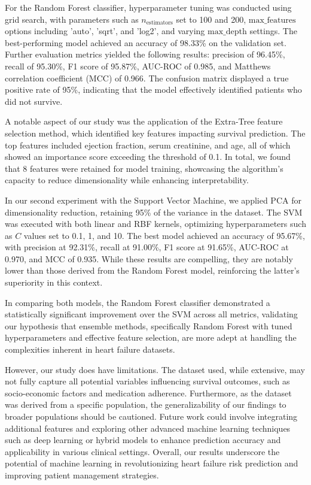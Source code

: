 \documentclass{article}
\begin{document}
For the Random Forest classifier, hyperparameter tuning was conducted using grid search, with parameters such as \(n_{\text{estimators}}\) set to 100 and 200, \( \text{max\_features} \) options including 'auto', 'sqrt', and 'log2', and varying \( \text{max\_depth} \) settings. The best-performing model achieved an accuracy of 98.33\% on the validation set. Further evaluation metrics yielded the following results: precision of 96.45\%, recall of 95.30\%, F1 score of 95.87\%, AUC-ROC of 0.985, and Matthews correlation coefficient (MCC) of 0.966. The confusion matrix displayed a true positive rate of 95\%, indicating that the model effectively identified patients who did not survive.

A notable aspect of our study was the application of the Extra-Tree feature selection method, which identified key features impacting survival prediction. The top features included ejection fraction, serum creatinine, and age, all of which showed an importance score exceeding the threshold of 0.1. In total, we found that 8 features were retained for model training, showcasing the algorithm's capacity to reduce dimensionality while enhancing interpretability.

In our second experiment with the Support Vector Machine, we applied PCA for dimensionality reduction, retaining 95\% of the variance in the dataset. The SVM was executed with both linear and RBF kernels, optimizing hyperparameters such as \(C\) values set to 0.1, 1, and 10. The best model achieved an accuracy of 95.67\%, with precision at 92.31\%, recall at 91.00\%, F1 score at 91.65\%, AUC-ROC at 0.970, and MCC of 0.935. While these results are compelling, they are notably lower than those derived from the Random Forest model, reinforcing the latter's superiority in this context.

In comparing both models, the Random Forest classifier demonstrated a statistically significant improvement over the SVM across all metrics, validating our hypothesis that ensemble methods, specifically Random Forest with tuned hyperparameters and effective feature selection, are more adept at handling the complexities inherent in heart failure datasets.

However, our study does have limitations. The dataset used, while extensive, may not fully capture all potential variables influencing survival outcomes, such as socio-economic factors and medication adherence. Furthermore, as the dataset was derived from a specific population, the generalizability of our findings to broader populations should be cautioned. Future work could involve integrating additional features and exploring other advanced machine learning techniques such as deep learning or hybrid models to enhance prediction accuracy and applicability in various clinical settings. Overall, our results underscore the potential of machine learning in revolutionizing heart failure risk prediction and improving patient management strategies.
\end{document}
